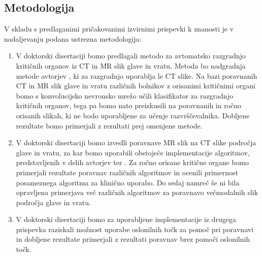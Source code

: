 \documentclass[a4paper,twoside,11pt]{article}
\begin{document}
	\subsection{Metodologija}
	\par{\noindent
		V skladu s predlaganimi pričakovanimi izvirnimi prispevki k znanosti je v nadaljevanju podana ustrezna metodologija:
		\begin{enumerate}
			\item V doktorski disertaciji bomo predlagali metodo za avtomatsko razgradnjo kritičnih organov iz CT in MR slik glave in vratu. Metoda bo nadgradnja metode avtorjev \cite{ibragimov2017}, ki za razgradnjo uporablja le CT slike. Na bazi poravnanih CT in MR slik glave in vratu različnih bolnikov z orisanimi kritičnimi organi bomo s konvolucijsko nevronsko mrežo učili klasifikator za razgradnjo kritičnih organov, tega pa bomo nato preizkusili na poravnanih in ročno orisanih slikah, ki ne bodo uporabljene za učenje razvrščevalnika. Dobljene rezultate bomo primerjali z rezultati prej omenjene metode.
			
			\item V doktorski disertaciji bomo izvedli poravnave MR slik na CT slike področja glave in vratu, za kar bomo uporabili obstoječe implementacije algoritmov, predstavljenih v delih avtorjev \cite{klein2010, avants2008} ter \cite{modat2010}. Za ročno orisane kritične organe bomo primerjali rezultate poravnav različnih algoritmov in ocenili primernost posameznega algoritma za klinično uporabo. Do sedaj namreč še ni bila opravljena primerjava več različnih algoritmov za poravnavo večmodalnih slik področja glave in vratu.
			
			\item V doktorski disertaciji bomo za uporabljene implementacije iz drugega prispevka raziskali možnost uporabe oslonilnih točk za pomoč pri poravnavi in dobljene rezultate primerjali z rezultati poravnav brez pomoči oslonilnih točk.
			
		\end{enumerate}
	}
	\renewcommand{\bibsection}{\subsection{Izbrana literatura}}
	
	\newpage
	\newpage
\end{document}
